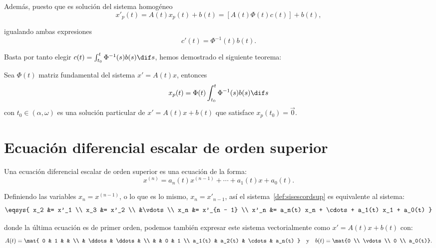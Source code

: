 \documentclass[../main.tex]{subfiles}
\begin{document}
Además, puesto que es solución del sistema homogéneo
\[x'_p(t) = A(t)x_p(t) + b(t) = [A(t) \Phi(t) c(t)] + b(t),\]

igualando ambas expresiones
\[c'(t) = \Phi^{-1}(t) b(t).\]

Basta por tanto elegir \(c(t) = \int_{t_0}^t \Phi^{-1}(s) b(s) \dif s\), hemos
demostrado el siguiente teorema:

\begin{theorem}
	Sea \(\Phi(t)\) matriz fundamental del sistema \(x' = A(t)x\), entonces 
	\[x_p(t) = \Phi(t) \int_{t_0}^t \Phi^{-1}(s) b(s) \dif s\]
	con \(t_0 \in (\alpha, \omega)\) es una solución particular de 
	\(x' = A(t)x + b(t)\) que satisface \(x_p(t_0) = \vec{0}\).
\end{theorem}

\section{Ecuación diferencial escalar de orden superior}

\begin{definition}
\label{def:sisescordsup}
	Una ecuación diferencial escalar de orden superior es una ecuación de la
	forma:
	\[x^{(n)} = a_n(t) x^{(n - 1)} + \cdots + a_1(t)x + a_0(t).\]
\end{definition}

Definiendo las variables \(x_n = x^{(n - 1)}\), o lo que es lo mismo,
\(x_n = x'_{n - 1}\), así el sistema~\ref{def:sisescordsup} es equivalente al
sistema:
\[\eqsys{
	x_2 &= x'_1 \\
	x_3 &= x'_2 \\
	&\vdots \\
	x_n &= x'_{n - 1} \\
	x'_n &= a_n(t) x_n + \cdots + a_1(t) x_1 + a_0(t)
	}\]

donde la última ecuación es de primer orden, podemos también expresar este
sistema vectorialmente como \(x' = A(t)x + b(t)\) con:
\[A(t) = \mat{ 
	0 & 1 & & \\
	& \ddots & \ddots & \\
	& & 0 & 1 \\
	a_1(t) & a_2(t) & \cdots & a_n(t)
	}
	\quad \text{y} \quad
	b(t) = \mat{0 \\ \vdots \\ 0 \\ a_0(t)}.
	\]
\end{document}
